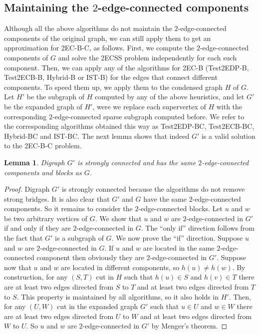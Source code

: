 \documentclass[11pt]{article}
\newtheorem{lemma}[theorem]{Lemma}
\begin{document}
\subsection{Maintaining the $2$-edge-connected components}
\label{sec:2-edge-components}

Although all the above algorithms do not maintain the $2$-edge-connected components of the original graph, we can still apply them to get an approximation for \textsf{2EC-B-C}, as follows.
First, we compute the $2$-edge-connected components of $G$
and solve the \textsf{2ECSS} problem independently for each such component. Then, we can apply any of the algorithms for \textsf{2EC-B} (\textsf{Test2EDP-B}, \textsf{Test2ECB-B}, \textsf{Hybrid-B} or \textsf{IST-B}) for the edges that connect different components.
To speed them up,  we apply them to the condensed graph $H$ of $G$.  Let $H'$ be the subgraph of $H$ computed by any of the above heuristics, and let $G'$ be the expanded graph of $H'$, were we replace each supervertex of $H$ with the corresponding $2$-edge-connected sparse subgraph computed before.
We refer to the corresponding algorithms obtained this way as \textsf{Test2EDP-BC}, \textsf{Test2ECB-BC}, \textsf{Hybrid-BC} and \textsf{IST-BC}.
The next lemma shows that indeed $G'$ is a valid solution to the \textsf{2EC-B-C} problem.

\begin{lemma}
\label{lemma:condensed}
Digraph $G'$ is strongly connected and has the same $2$-edge-connected components and blocks as $G$.
\end{lemma}
\begin{proof}
Digraph $G'$ is strongly connected because the algorithms do not remove strong bridges. It is also clear that $G'$ and $G$ have the same $2$-edge-connected components. So it remains to consider the $2$-edge-connected blocks. Let $u$ and $w$ be two arbitrary vertices of $G$. We show that $u$ and $w$ are $2$-edge-connected in $G'$ if and only if they are $2$-edge-connected in $G$.
The ``only if'' direction follows from the fact that $G'$ is a subgraph of $G$. We now prove the ``if'' direction. Suppose $u$ and $w$ are $2$-edge-connected in $G$.
If $u$ and $w$ are located in the same $2$-edge-connected component then obviously they are $2$-edge-connected in $G'$. Suppose now that $u$ and $w$ are located in different components, so $h(u) \not= h(w)$. By construction,  for any $(S,T)$ cut in $H$ such that $h(u) \in S$ and $h(v) \in T$ there are at least two edges directed from $S$ to $T$ and at least two edges directed from $T$ to $S$. This property is maintained by all algorithms, so it also holds in $H'$.
Then, for any $(U,W)$ cut in the expanded graph $G'$ such that $u \in U$ and $w \in W$ there are at least two edges directed from $U$ to $W$ and at least two edges directed from $W$ to $U$. So $u$ and $w$ are $2$-edge-connected in $G'$ by Menger's theorem.
\end{proof}
\end{document}

